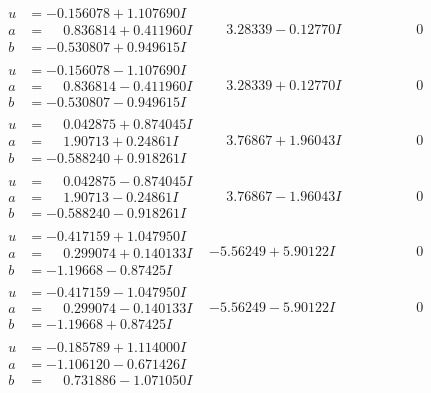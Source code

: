 \documentclass[1p]{elsarticle_modified}
\theoremstyle{definition}
\begin{document}
$$\begin{array}{c|c|c}
\begin{aligned}
u &= -0.156078 + 1.107690 I \\
a &= \phantom{-}0.836814 + 0.411960 I \\
b &= -0.530807 + 0.949615 I\end{aligned}
 & \phantom{-}3.28339 - 0.12770 I & \phantom{-0.000000 } 0 \\ \hline\begin{aligned}
u &= -0.156078 - 1.107690 I \\
a &= \phantom{-}0.836814 - 0.411960 I \\
b &= -0.530807 - 0.949615 I\end{aligned}
 & \phantom{-}3.28339 + 0.12770 I & \phantom{-0.000000 } 0 \\ \hline\begin{aligned}
u &= \phantom{-}0.042875 + 0.874045 I \\
a &= \phantom{-}1.90713 + 0.24861 I \\
b &= -0.588240 + 0.918261 I\end{aligned}
 & \phantom{-}3.76867 + 1.96043 I & \phantom{-0.000000 } 0 \\ \hline\begin{aligned}
u &= \phantom{-}0.042875 - 0.874045 I \\
a &= \phantom{-}1.90713 - 0.24861 I \\
b &= -0.588240 - 0.918261 I\end{aligned}
 & \phantom{-}3.76867 - 1.96043 I & \phantom{-0.000000 } 0 \\ \hline\begin{aligned}
u &= -0.417159 + 1.047950 I \\
a &= \phantom{-}0.299074 + 0.140133 I \\
b &= -1.19668 - 0.87425 I\end{aligned}
 & -5.56249 + 5.90122 I & \phantom{-0.000000 } 0 \\ \hline\begin{aligned}
u &= -0.417159 - 1.047950 I \\
a &= \phantom{-}0.299074 - 0.140133 I \\
b &= -1.19668 + 0.87425 I\end{aligned}
 & -5.56249 - 5.90122 I & \phantom{-0.000000 } 0 \\ \hline\begin{aligned}
u &= -0.185789 + 1.114000 I \\
a &= -1.106120 - 0.671426 I \\
b &= \phantom{-}0.731886 - 1.071050 I\end{aligned}

\end{array}$$
\end{document}
